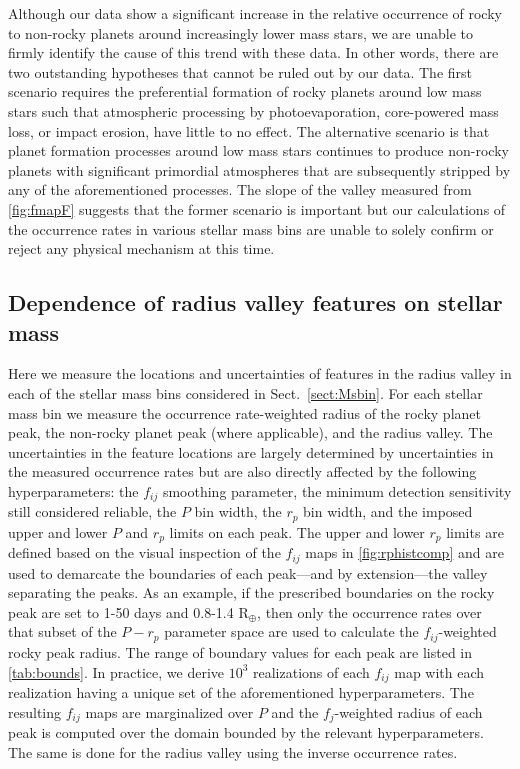 \documentclass[twocolumn]{emulateapj}
\begin{document}
Although our data show a significant increase in the relative occurrence of rocky to non-rocky planets
around increasingly lower mass stars, we are unable to firmly identify the cause of this trend with these data.
In other words, there are two outstanding hypotheses that cannot be ruled out by our data. The first scenario
requires the preferential formation of rocky planets around low mass stars such that atmospheric processing
by photoevaporation, core-powered mass loss, or impact erosion, have little to no effect. The alternative scenario
is that planet formation processes around low mass stars continues to produce non-rocky planets with significant
primordial atmospheres that are subsequently stripped by any of the aforementioned processes. The slope of the
valley measured from \autoref{fig:fmapF} suggests that the former scenario is important but our calculations of
the occurrence rates in various stellar mass bins are unable to solely confirm or reject any physical mechanism
at this time. 


\subsection{Dependence of radius valley features on stellar mass}
Here we measure the locations and uncertainties of features in the radius valley in each of the stellar
mass bins considered in Sect.~\ref{sect:Msbin}. For each stellar mass bin
we measure the occurrence rate-weighted radius of the rocky planet peak,
the non-rocky planet peak (where applicable), and the radius valley. The uncertainties in the feature locations
are largely determined by uncertainties in the measured occurrence rates but are also directly affected by
the following hyperparameters: the $f_{ij}$ smoothing parameter, the minimum detection sensitivity still
considered reliable,
the $P$ bin width, the $r_p$ bin width, and the imposed upper and
lower $P$ and $r_p$ limits on each peak. The upper and lower $r_p$ limits are defined based on the visual
inspection of the $f_{ij}$ maps in \autoref{fig:rphistcomp} and are used to demarcate the
boundaries of each peak---and by extension---the valley separating the peaks.
As an example, if the prescribed boundaries on the rocky peak are set to 1-50 days and 0.8-1.4 R$_{\oplus}$,
then only the occurrence rates over that subset of the $P-r_p$ parameter space are used to calculate the
$f_{ij}$-weighted rocky peak radius. The range of boundary values for each peak are listed in
\autoref{tab:bounds}. In practice, we derive $10^3$ realizations of each $f_{ij}$ map with each realization
having a unique set of the aforementioned hyperparameters.
The resulting $f_{ij}$ maps are marginalized over $P$ and the $f_j$-weighted radius of
each peak is computed over the domain bounded by the relevant hyperparameters.
The same is done for the radius valley using the inverse occurrence rates.
\end{document}
